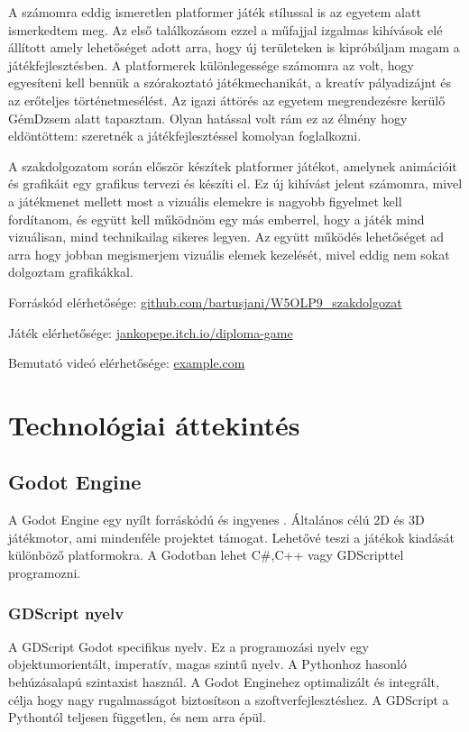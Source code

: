 \documentclass[
]{thesis-ekf}
\theoremstyle{definition}
\theoremstyle{remark}
\begin{document}
A számomra eddig ismeretlen platformer játék stílussal is az egyetem alatt ismerkedtem meg. Az első találkozásom ezzel a műfajjal izgalmas kihívások elé állított amely lehetőséget adott arra, hogy új területeken is kipróbáljam magam a játékfejlesztésben. A platformerek különlegessége számomra az volt, hogy egyesíteni kell bennük a szórakoztató játékmechanikát, a kreatív pályadizájnt és az erőteljes történetmesélést. Az igazi áttörés az egyetem megrendezésre kerülő GémDzsem alatt tapasztam. Olyan hatással volt rám ez az élmény hogy eldöntöttem: szeretnék a játékfejlesztéssel komolyan foglalkozni.

A szakdolgozatom során először készítek platformer játékot, amelynek animációit és grafikáit  egy grafikus tervezi és készíti el. Ez új kihívást jelent számomra, mivel a játékmenet mellett most a vizuális elemekre is nagyobb figyelmet kell fordítanom, és együtt kell működnöm egy más emberrel, hogy a játék mind vizuálisan, mind technikailag sikeres legyen. Az együtt működés lehetőséget ad arra hogy jobban megismerjem vizuális elemek kezelését, mivel eddig nem sokat dolgoztam grafikákkal.

Forráskód elérhetősége: \href{https://github.com/bartusjani/W5OLP9_szakdolgozat}{github.com/bartusjani/W5OLP9\_szakdolgozat}

Játék elérhetősége: \href{https://jankopepe.itch.io/diploma-game}{jankopepe.itch.io/diploma-game}

Bemutató videó elérhetősége: \href{https://example.com}{example.com}


\chapter{Technológiai áttekintés}

\section{Godot Engine}

A Godot Engine egy nyílt forráskódú és ingyenes . Általános célú 2D és 3D játékmotor, ami mindenféle projektet támogat. Lehetővé teszi a játékok kiadását különböző platformokra. A Godotban lehet C\#,C++ vagy GDScripttel programozni.
\subsection{GDScript nyelv}
A GDScript Godot specifikus nyelv. Ez a programozási nyelv egy objektumorientált, imperatív, magas szintű nyelv. A Pythonhoz hasonló behúzásalapú szintaxist használ. A Godot Enginehez optimalizált és integrált, célja hogy nagy rugalmasságot biztosítson a szoftverfejlesztéshez. A GDScript a Pythontól  teljesen független, és nem arra épül.
\end{document}
